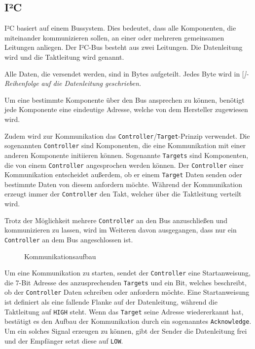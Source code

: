 \subsection{I²C}


I²C basiert auf einem Bussystem.
Dies bedeutet, dass alle Komponenten, die miteinander kommunizieren sollen, an einer oder mehreren gemeinsamen Leitungen anliegen.
Der I²C-Bus besteht aus zwei Leitungen.
Die Datenleitung wird  und die Taktleitung wird  genannt.

Alle Daten, die versendet werden, sind in Bytes aufgeteilt.
Jedes Byte wird in [\itshape]-Reihenfolge auf die Datenleitung geschrieben.

Um eine bestimmte Komponente über den Bus ansprechen zu können, benötigt jede Komponente eine eindeutige Adresse, welche von dem Hersteller zugewiesen wird.

Zudem wird zur Kommunikation das \texttt{Controller}/\texttt{Target}-Prinzip verwendet.
Die sogenannten \texttt{Controller} sind Komponenten, die eine Kommunikation mit einer anderen Komponente initiieren können.
Sogenannte \texttt{Targets} sind Komponenten, die von einem \texttt{Controller} angesprochen werden können.
Der \texttt{Controller} einer Kommunikation entscheidet außerdem, ob er einem \texttt{Target} Daten senden oder bestimmte Daten von diesem anfordern möchte.
Während der Kommunikation erzeugt immer der \texttt{Controller} den Takt, welcher über die Taktleitung verteilt wird.

Trotz der Möglichkeit mehrere \texttt{Controller} an den Bus anzuschließen und kommunizieren zu lassen, wird im Weiteren davon ausgegangen, dass nur ein \texttt{Controller} an dem Bus angeschlossen ist.

\begin{wrapfigure}{r}{.45\textwidth}
	\centering
	\scalebox{1.25}{}
	
	\caption{Kommunikationsaufbau}
	\label{i2c-start}
\end{wrapfigure}
Um eine Kommunikation zu starten, sendet der \texttt{Controller} eine Startanweisung, die 7-Bit Adresse des anzusprechenden \texttt{Targets} und ein Bit, welches beschreibt, ob der \texttt{Controller} Daten schreiben oder anfordern möchte.
Eine Startanweisung ist definiert als eine fallende Flanke auf der Datenleitung, während die Taktleitung auf \texttt{HIGH} steht.
Wenn das \texttt{Target} seine Adresse wiedererkannt hat, bestätigt es den Aufbau der Kommunikation durch ein sogenanntes \texttt{Acknowledge}.
Um ein solches Signal erzeugen zu können, gibt der Sender die Datenleitung frei und der Empfänger setzt diese auf \texttt{LOW}.

